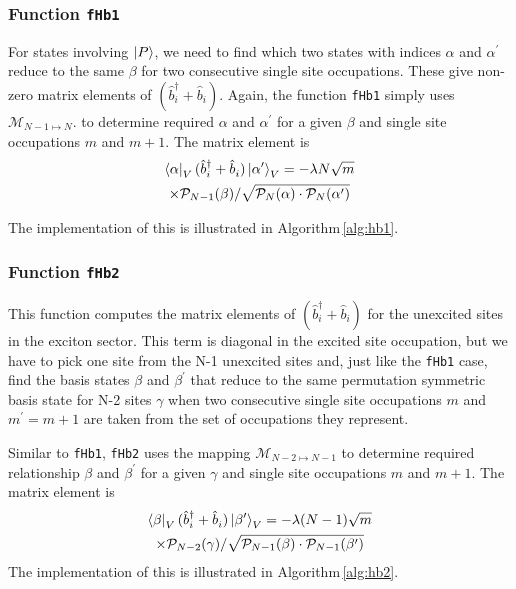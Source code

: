 \documentclass[final,twocolumn]{elsarticle}
\newcommand{\cntset}{\mathcal{P}_N}
\newcommand{\cntsetx}{\mathcal{P}_{N-1}}
\newcommand{\cntsetxx}{\mathcal{P}_{N-2}}
\newcommand{\maptoN}{{{\mathcal{M}}}_{N-1 \mapsto N}}
\newcommand{\maptoNa}{{\mathcal{M}}_{N-2 \mapsto N-1}}
\begin{document}
\begin{small}
\subsubsection{Function \texttt{fHb1}}
For states involving $\ket{P}$,
we need to find which two states with indices
$\alpha$ and $\alpha^\prime$ reduce to the same 
$\beta$ for two consecutive single site occupations.
These give non-zero matrix elements of
$( \hat b^\dagger_i + \hat b^{}_i )$.
Again, the function \texttt{fHb1} simply uses $\maptoN$.
to determine required
$\alpha$ and $\alpha^\prime$ for a given $\beta$
and single site occupations $m$ and $m+1$.
The matrix element is
\begin{multline}
\bra{\alpha}_V( \hat b^\dagger_i + \hat b^{}_i )\ket{\alpha^\prime}_V= -\lambda N\sqrt{m}
\\ \times
\cntsetx(\beta) /\sqrt{\cntset(\alpha)\cdot \cntset(\alpha^\prime)}
\end{multline}


The implementation of this is illustrated in Algorithm\,\ref{alg:hb1}.


\subsubsection{Function \texttt{fHb2}}
This function computes the matrix elements of
$( \hat b^\dagger_i + \hat b^{}_i )$
for the unexcited sites in the exciton sector.
This term is diagonal in the excited site occupation,
but we have to pick one site from the N-1 unexcited sites
and, just like the \texttt{fHb1} case, find the basis states 
$\beta$ and $\beta^\prime$ that reduce to the same 
permutation symmetric basis state for N-2 sites
$\gamma$ when two consecutive single site occupations
 $m$ and $m^\prime=m+1$ are taken from the set of occupations they represent.


Similar to \texttt{fHb1}, \texttt{fHb2} uses the mapping $\maptoNa$
to determine required relationship 
$\beta$ and $\beta^\prime$ for a given $\gamma$
and single site occupations $m$ and $m+1$.
The matrix element is
\begin{multline}
\bra{\beta}_V( \hat b^\dagger_i + \hat b^{}_i )\ket{\beta^\prime}_V= -\lambda(N-1)\sqrt{m}
\\ \times \cntsetxx(\gamma) /\sqrt{\cntsetx(\beta)\cdot \cntsetx(\beta^\prime)}
\end{multline}
The implementation of this is illustrated in Algorithm\,\ref{alg:hb2}.






\end{small}
\end{document}
